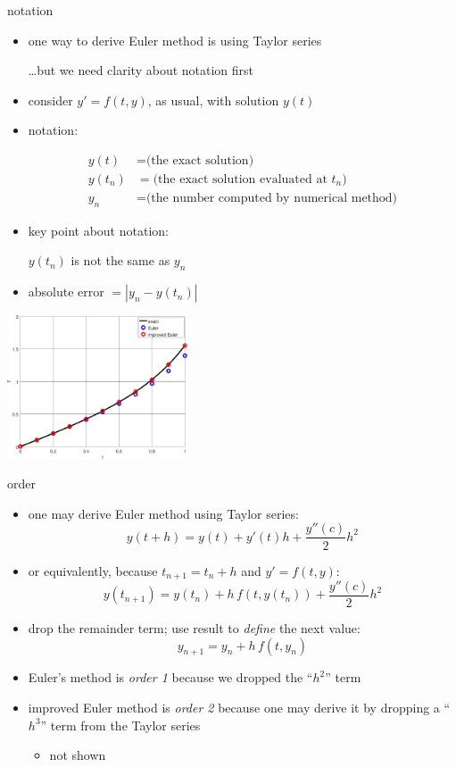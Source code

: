 \documentclass[urlcolor=blue,dvipsnames]{beamer}
\begin{document}
\begin{frame}{notation}

\begin{itemize}
\item one way to derive Euler method is using Taylor series

      \dots but we need clarity about notation first
\item consider $y'=f(t,y)$, as usual, with solution $y(t)$
\item notation:

\vspace{-6mm}
\begin{align*}
y(t) &= \text{(the exact solution)} \\
y(t_n) &= \text{(the exact solution evaluated at $t_n$)} \\
y_n &= \text{(the number computed by numerical method)}
\end{align*}
\item key point about notation:

\medskip
\centerline{\alert{$y(t_n)$ is not the same as $y_n$} \hspace{40mm}}

\medskip
\item absolute error $=|y_n-y(t_n)|$
\end{itemize}

\vspace{-20mm}
\hfill \includegraphics[width=0.4\textwidth]{figs/goodstyle}
\end{frame}


\begin{frame}{order}

\begin{itemize}
\item one may derive Euler method using Taylor series:
   $$y(t+h) = y(t) + y'(t) h + \frac{y''(c)}{2} h^2$$
\item or equivalently, because $t_{n+1} = t_n+h$ and $y'=f(t,y)$:
   $$y(t_{n+1}) = y(t_n) + h\, f(t,y(t_n)) + \frac{y''(c)}{2} h^2$$
\item drop the remainder term; use result to \emph{define} the next value:
   $$y_{n+1} = y_n + h\, f(t,y_n)$$
\item Euler's method is \emph{order 1} because we dropped the ``$h^2$'' term
\item improved Euler method is \emph{order 2} because one may derive it by dropping a ``$h^3$'' term from the Taylor series
    \begin{itemize}
    \item not shown
    \end{itemize}
\end{itemize}
\end{frame}
\end{document}
